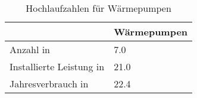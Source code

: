 {
\renewcommand{\arraystretch}{1.2}%
\begin{table}[H]
	\begin{center}
		\caption{Hochlaufzahlen für Wärmepumpen}
		\begin{tabu} to 0.55\textwidth {X[1.7] X[1, r]}
			\toprule
												& Wärmepumpen 	\\ \midrule
			Anzahl in \si{\MioStkSCtoo}     	& \num{7.0}  	\\
			Installierte Leistung in \si{\gw}	& \num{21.0}  	\\
			Jahresverbrauch in \si{\twh}		& \num{22.4}  	\\ \bottomrule
		\end{tabu}
		\label{tab:WP-RampUp}
	\end{center}
	\vspace{-3mm}%
\end{table}
}